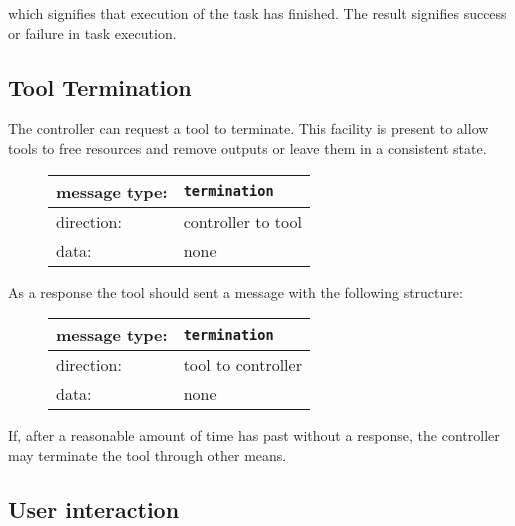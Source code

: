 \documentclass{article}
\newcommand{\msg}[1]{\texttt{#1}}
\begin{document}
   \noindent which signifies that execution of the task has finished. The
   result signifies success or failure in task execution.

  \subsection{Tool Termination}

   \noindent The controller can request a tool to terminate. This facility is
   present to allow tools to free resources and remove outputs or leave
   them in a consistent state.

   \begin{figure}[H]
    \begin{center}
     \begin{tabular}{|ll|}
      \hline
       message type:    & \msg{termination} \\
      \hline
       direction:       & controller to tool \\
       data:            & none \\
      \hline
     \end{tabular}
    \end{center}
   \end{figure}

   \noindent As a response the tool should sent a message with the following
   structure:

   \begin{figure}[H]
    \begin{center}
     \begin{tabular}{|ll|}
      \hline
       message type:   & \msg{termination} \\
      \hline
       direction:      & tool to controller \\
       data:           & none \\
      \hline
     \end{tabular}
    \end{center}
   \end{figure}

   If, after a reasonable amount of time has past without a response, the
   controller may terminate the tool through other means.

  \pagebreak

  \subsection{User interaction} \label{ss:user_interaction}
\end{document}
